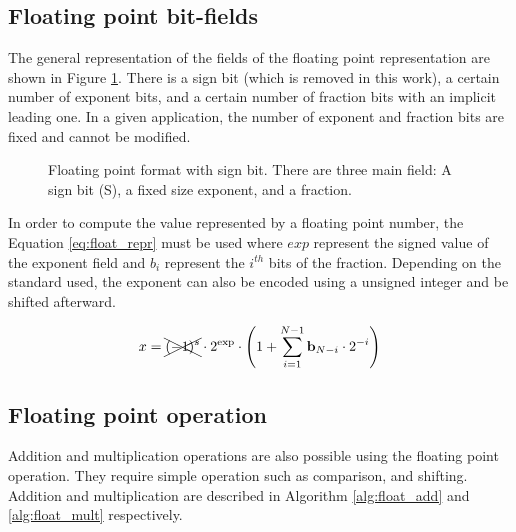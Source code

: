 \subsection{Floating point bit-fields}

The general representation of the fields of the floating point representation are shown in Figure \ref{fig:float_repr}. There is a sign bit (which is removed in this work), a certain number of exponent bits, and a certain number of fraction bits with an implicit leading one. In a given application, the number of exponent and fraction bits are fixed and cannot be modified.

\begin{figure}[!ht]
\begin{mdframed}
	\centering
	
	\caption{Floating point format with sign bit. There are three main field: A sign bit (S), a fixed size exponent, and a fraction.}
	\label{fig:float_repr}
\end{mdframed}
\end{figure}

In order to compute the value represented by a floating point number, the Equation \ref{eq:float_repr} must be used where $exp$ represent the signed value of the exponent field and $b_i$ represent the $i^{th}$ bits of the fraction. Depending on the standard used, the exponent can also be encoded using a unsigned integer and be shifted afterward.

\begin{equation}
x = \xcancel{(-1)^s} \cdot 2^{\text{exp}} \cdot \left( 1 + \sum_{i=1}^{N-1} \text{\textbf{b}}_{N-i} \cdot 2^{-i}\right)
\label{eq:float_repr}
\end{equation}

\subsection{Floating point operation}
Addition and multiplication operations are also possible using the floating point operation. They require simple operation such as comparison, and shifting. Addition and multiplication are described in Algorithm \ref{alg:float_add} and \ref{alg:float_mult} respectively.

